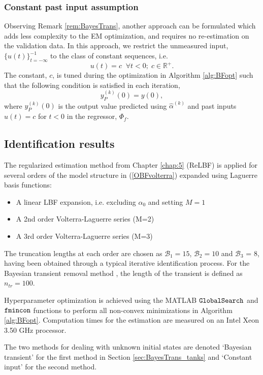 \subsubsection{Constant past input assumption}
\label{sec:ConstInput_tanks}

Observing Remark \ref{rem:BayesTrans}, another approach can be formulated which adds less complexity to the EM optimization, and requires no re-estimation on the validation data. In this approach, we restrict the unmeasured input, $\{u(t)\}_{t=-\infty}^{-1}$ to the class of constant sequences, i.e.
$$u(t) = c \; \; \forall t<0; \; c \in \mathbb{R}^+.$$ 
The constant, $c$, is tuned during the optimization in Algorithm \ref{alg:BFopt} such that the following condition is satisfied in each iteration, 
$$y_P^{(k)}(0) = y(0),$$ 
where $y_P^{(k)}(0)$ is the output value predicted using $\hat{\alpha}^{(k)}$ and past inputs $u(t)=c$ for $t<0$ in the regressor, $\Phi_f$.  

\subsection{Identification results}
\label{sec:Results_tanks}

The regularized estimation method from Chapter \ref{chap:5} (ReLBF) is applied for several orders of the model structure in (\ref{OBFvolterra}) expanded using Laguerre basis functions:
\begin{itemize}
\item A linear LBF expansion, i.e. excluding $\alpha_0$ and setting $M=1$
\item A 2nd order Volterra-Laguerre series (M=2)
\item A 3rd order Volterra-Laguerre series (M=3)
\end{itemize}

The truncation lengths at each order are chosen as $\mathcal{B}_1 = 15$, $\mathcal{B}_2 = 10$ and $\mathcal{B}_3$ = 8, having been obtained through a typical iterative identification process. For the Bayesian transient removal method \cite{Birpoutsoukis2017b}, the length of the transient is defined as $n_{tr} = 100$.

Hyperparameter optimization is achieved using the MATLAB $\text{\tt{GlobalSearch}}$ and $\text{\tt{fmincon}}$ functions to perform all non-convex minimizations in Algorithm \ref{alg:BFopt}. Computation times for the estimation are measured on an Intel Xeon 3.50 GHz processor.

The two methods for dealing with unknown initial states are denoted `Bayesian transient' for the first method in Section \ref{sec:BayesTrans_tanks} and `Constant input' for the second method.

